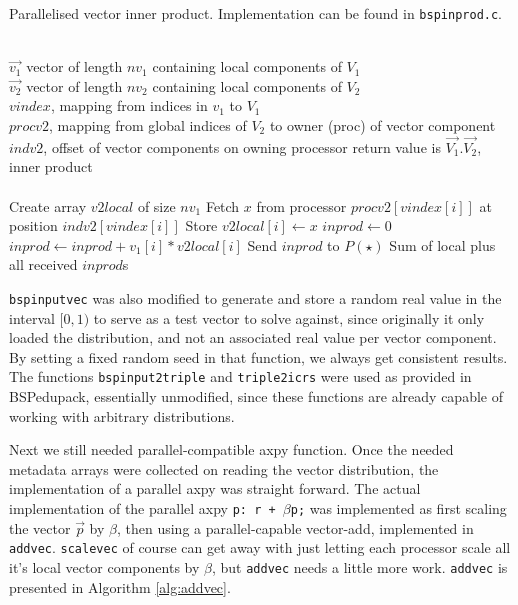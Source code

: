 \documentclass[a4paper]{article}
\newcommand{\ve}[1]{\ensuremath{\vec{#1}}}
\begin{document}
\begin{algorithm}
    \caption{Parallelised vector inner product. Implementation can be found in \texttt{bspinprod.c}.}
\label{alg:bspip}
\begin{algorithmic}
    \REQUIRE ~\\
             $\ve  {v_1}$ vector of length $nv_1$ containing local components of $V_1$\\
             $\ve  {v_2}$ vector of length $nv_2$ containing local components of $V_2$\\
             $vindex$, mapping from indices in $v_1$ to $V_1$\\
             $procv2$, mapping from global indices of $V_2$ to owner (proc) of vector component\\
             $indv2$, offset of vector components on owning processor
    \ENSURE  return value is $\ve{V_1}.\ve{V_2}$, inner product\\~\\
    \STATE Create array $v2local$ of size $nv_1$
    \STATE Fetch $x$ from processor $procv2[vindex[i]]$ at position $indv2[vindex[i]]$
    \STATE Store $v2local[i] \leftarrow x$
    \ENDFOR
    \STATE $inprod \leftarrow 0$
    \STATE $inprod \leftarrow inprod + v_1[i]*v2local[i]$
    \ENDFOR {}
    \STATE Send $inprod$ to $P(\star)$ 
    \RETURN Sum of local plus all received $inprod$s
\end{algorithmic}
\end{algorithm}

\texttt{bspinputvec} was also modified to generate and store a random real
value in the interval $[0,1)$ to serve as a test vector to solve against, since
    originally it only loaded the distribution, and not an associated real
    value per vector component. By setting a fixed random seed in that
    function, we always get consistent results. The functions
    \texttt{bspinput2triple} and \texttt{triple2icrs} were used as provided in
    BSPedupack, essentially unmodified, since these functions are already
    capable of working with arbitrary distributions.


Next we still needed parallel-compatible axpy function. Once the needed metadata arrays
were collected on reading the vector distribution, the implementation of a parallel axpy
was straight forward.
The actual implementation of the parallel axpy \texttt{p: r + $\beta$p;} was implemented
as first scaling the vector \ve p by $\beta$, then using a parallel-capable vector-add,
implemented in \texttt{addvec}.
\texttt{scalevec} of course can get away with just letting each processor scale all it's local
vector components by $\beta$, but \texttt{addvec} needs a little more work. 
\texttt{addvec} is presented in Algorithm \ref{alg:addvec}.
\end{document}
